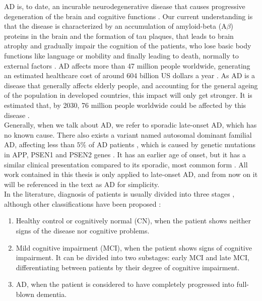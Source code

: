 AD is, to date, an incurable neurodegenerative disease that causes progressive degeneration of the brain and cognitive functions \cite{Lane2018}. Our current understanding is that the disease is characterized by an accumulation of amyloid-beta (A$\beta$) proteins in the brain and the formation of tau plaques, that leads to brain atrophy and gradually impair the cognition of the patients, who lose basic body functions like language or mobility and finally leading to death, normally to external factors \cite{Ballard2011}. AD affects more than 47 million people worldwide, generating an estimated healthcare cost of around 604 billion US dollars a year \cite{AlzheimersAssociation}. As AD is a disease that generally affects elderly people, and accounting for the general ageing of the population in developed countries, this impact will only get stronger. It is estimated that, by 2030, 76 million people worldwide could be affected by this disease \cite{AlzheimersAssociation}. \\

Generally, when we talk about AD, we refer to sporadic late-onset AD, which has no known cause. There also exists a variant named autosomal dominant familial AD, affecting less than $5\%$ of AD patients \cite{Bird1993}, which is caused by genetic mutations in APP, PSEN1 and PSEN2 genes \cite{Campion1999}. It has an earlier age of onset, but it has a similar clinical presentation compared to its sporadic, most common form \cite{Ryan2016}. All work contained in this thesis is only applied to late-onset AD, and from now on it will be referenced in the text as AD for simplicity. \\

In the literature, diagnosis of patients is usually divided into three stages \cite{Brookmeyer2007}, although other classifications have been proposed \cite{Jack2018}:

\begin{enumerate}\itemsep5pt
\item Healthy control or cognitively normal (CN), when the patient shows neither signs of the disease nor cognitive problems.
\item Mild cognitive impairment (MCI), when the patient shows signs of cognitive impairment. It can be divided into two substages: early MCI and late MCI, differentiating between patients by their degree of cognitive impairment.
\item AD, when the patient is considered to have completely progressed into full-blown dementia.
\end{enumerate}

